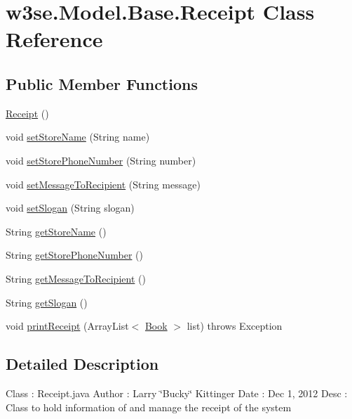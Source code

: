 \hypertarget{classw3se_1_1_model_1_1_base_1_1_receipt}{\section{w3se.\-Model.\-Base.\-Receipt Class Reference}
\label{classw3se_1_1_model_1_1_base_1_1_receipt}
}
\subsection*{Public Member Functions}
\begin{DoxyCompactItemize}
\item 
\hyperlink{classw3se_1_1_model_1_1_base_1_1_receipt_a917d51ae90391b90eef58b0144cc0497}{Receipt} ()
\item 
void \hyperlink{classw3se_1_1_model_1_1_base_1_1_receipt_a085e915639ef45572ef559c6343d642b}{set\-Store\-Name} (String name)
\item 
void \hyperlink{classw3se_1_1_model_1_1_base_1_1_receipt_a5eac06c2c75a967c5f9e8eda15d3cb2e}{set\-Store\-Phone\-Number} (String number)
\item 
void \hyperlink{classw3se_1_1_model_1_1_base_1_1_receipt_a7a93aaacd01b3eca3f4ec5d1b154ede1}{set\-Message\-To\-Recipient} (String message)
\item 
void \hyperlink{classw3se_1_1_model_1_1_base_1_1_receipt_a1b337d32b6f2d5699ee6777ccc42a93a}{set\-Slogan} (String slogan)
\item 
String \hyperlink{classw3se_1_1_model_1_1_base_1_1_receipt_a08928851ed3ee3ace4fc4a92c7ed0f07}{get\-Store\-Name} ()
\item 
String \hyperlink{classw3se_1_1_model_1_1_base_1_1_receipt_af7779f5d1c9bc670994181ea17c75848}{get\-Store\-Phone\-Number} ()
\item 
String \hyperlink{classw3se_1_1_model_1_1_base_1_1_receipt_a3119a9abb1ca10b7b1d739556d6ff4be}{get\-Message\-To\-Recipient} ()
\item 
String \hyperlink{classw3se_1_1_model_1_1_base_1_1_receipt_a9f5a5e08f212d6b97d061e7d18dcc025}{get\-Slogan} ()
\item 
void \hyperlink{classw3se_1_1_model_1_1_base_1_1_receipt_ae837ee0d5556799b7f5a2c6ab0dfb571}{print\-Receipt} (Array\-List$<$ \hyperlink{classw3se_1_1_model_1_1_base_1_1_book}{Book} $>$ list)  throws Exception 	
\end{DoxyCompactItemize}


\subsection{Detailed Description}
Class \-: Receipt.\-java Author \-: Larry \char`\"{}\-Bucky\char`\"{} Kittinger Date \-: Dec 1, 2012 Desc \-: Class to hold information of and manage the receipt of the system 

